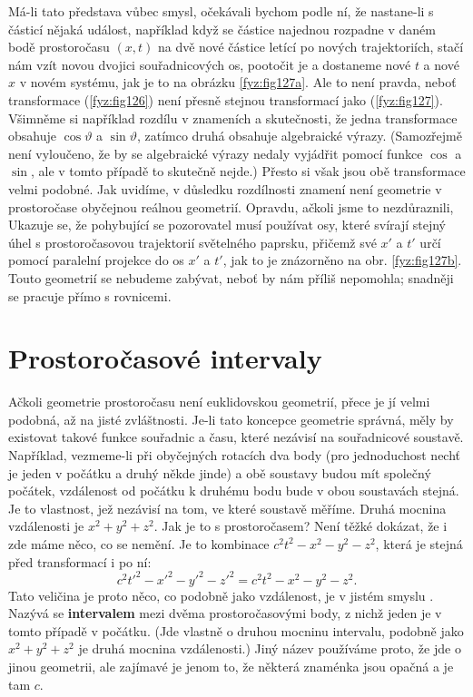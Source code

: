     Má-li tato představa vůbec smysl, očekávali bychom podle ní, že nastane-li s částicí nějaká 
    událost, například když se částice najednou rozpadne v daném bodě prostoročasu \((x, t)\) na 
    dvě nové částice letící po nových trajektoriích, stačí nám vzít novou dvojici souřadnicových 
    os, pootočit je a dostaneme nové \(t\) a nové \(x\) v novém systému, jak je to na obrázku 
    \ref{fyz:fig127a}. Ale to není pravda, neboť transformace (\ref{fyz:fig126}) není přesně 
    stejnou transformací jako (\ref{fyz:fig127}). Všimněme si například rozdílu v znameních a 
    skutečnosti, že jedna transformace obsahuje \(\cos\vartheta\) a \(\sin\vartheta\), zatímco 
    druhá obsahuje algebraické výrazy. (Samozřejmě není vyloučeno, že by se algebraické výrazy 
    nedaly vyjádřit pomocí funkce \(\cos\) a \(\sin\), ale v tomto případě to skutečně nejde.) 
    Přesto si však jsou obě transformace velmi podobné. Jak uvidíme, v důsledku rozdílnosti znamení 
    není geometrie v prostoročase obyčejnou reálnou geometrií. Opravdu, ačkoli jsme to 
    nezdůraznili, Ukazuje se, že pohybující se pozorovatel musí používat osy, které svírají stejný 
    úhel s prostoročasovou trajektorií světelného paprsku, přičemž své \(x'\) a \(t'\) určí pomocí 
    paralelní projekce do os \(x'\) a \(t'\), jak to je znázorněno na obr. \ref{fyz:fig127b}. Touto 
    geometrií se nebudeme zabývat, neboť by nám příliš nepomohla; snadněji se pracuje přímo s 
    rovnicemi.
    
  \section{Prostoročasové intervaly}\label{fyz:IchapXVIIsecII}
    Ačkoli geometrie prostoročasu není euklidovskou geometrií, přece je jí velmi podobná, až na 
    jisté zvláštnosti. Je-li tato koncepce geometrie správná, měly by existovat takové funkce 
    souřadnic a času, které nezávisí na souřadnicové soustavě. Například, vezmeme-li při obyčejných 
    rotacích dva body (pro jednoduchost nechť je jeden v počátku a druhý někde jinde) a obě 
    soustavy budou mít společný počátek, vzdálenost od počátku k druhému bodu bude v obou 
    soustavách stejná. Je to vlastnost, jež nezávisí na tom, ve které soustavě měříme. Druhá 
    mocnina vzdálenosti je \(x^2+y^2+z^2\). Jak je to s prostoročasem? Není těžké dokázat, že i 
    zde máme něco, co se nemění. Je to kombinace \(c^2t^2 - x^2 - y^2 - z^2\), která je stejná před 
    transformací i po ní:
    \begin{equation}\label{fyz:eq222}
      c^2t'^2 - x'^2 - y'^2 - z'^2 = c^2t^2 - x^2 - y^2 - z^2.
    \end{equation}
    Tato veličina je proto něco, co podobně jako vzdálenost, je v jistém smyslu . Nazývá 
    se \textbf{intervalem} mezi dvěma prostoročasovými body, z nichž jeden je v tomto případě v 
    počátku. (Jde vlastně o druhou mocninu intervalu, podobně jako \(x^2 + y^2 + z^2\) je druhá 
    mocnina vzdálenosti.) Jiný název používáme proto, že jde o jinou geometrii, ale zajímavé je 
    jenom to, že některá znaménka jsou opačná a je tam \(c\).
    
